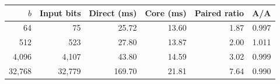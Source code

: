 \begin{tabular}{rrrrrr}
\toprule
$b$ & Input bits & Direct (ms) & Core (ms) & Paired ratio & A/A \\
\midrule
64 & 75 & 25.72 & 13.60 & 1.87 & 0.997 \\
512 & 523 & 27.80 & 13.87 & 2.00 & 1.011 \\
4,096 & 4,107 & 43.80 & 14.59 & 3.02 & 0.999 \\
32,768 & 32,779 & 169.70 & 21.81 & 7.64 & 0.990 \\
\bottomrule
\end{tabular}
